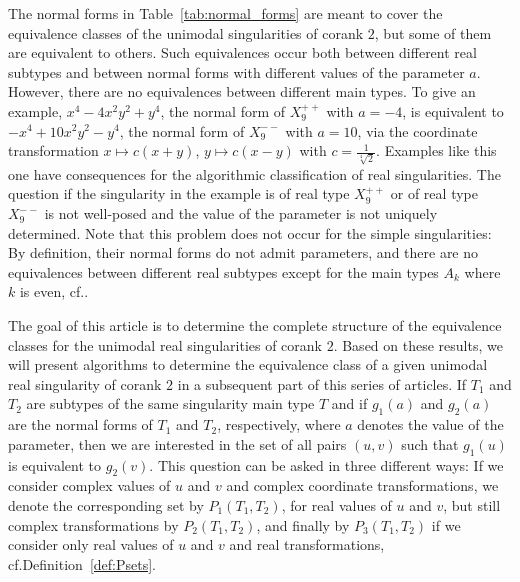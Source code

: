 \documentclass[noend]{amsproc}
\theoremstyle{definition}
\begin{document}
The normal forms in Table~\ref{tab:normal_forms} are meant to cover the
equivalence classes of the unimodal singularities of corank $2$, but some of
them are equivalent to others. Such equivalences occur both between different
real subtypes and between normal forms with different values of the parameter
$a$. However, there are no equivalences between different main types. To give
an example, $x^4-4x^2y^2+y^4$, the normal form of $X_9^{++}$ with $a = -4$, is
equivalent to $-x^4+10x^2y^2-y^4$, the normal form of $X_9^{--}$ with $a = 10$,
via the coordinate transformation $x \mapsto c(x+y)$, $y \mapsto c(x-y)$ with
$c = \frac{1}{\sqrt[4]{2}}$. Examples like this one have consequences for the
algorithmic classification of real singularities. The question if the
singularity in the example is of real type $X_9^{++}$ or of real type
$X_9^{--}$ is not well-posed and the value of the parameter is not uniquely
determined. Note that this problem does not occur for the simple singularities:
By definition, their normal forms do not admit parameters, and there are no
equivalences between different real subtypes except for the main types $A_k$
where $k$ is even, cf.\@ \citet{MS2013}.

The goal of this article is to determine the complete structure of the
equivalence classes for the unimodal real singularities of corank $2$. Based on
these results, we will present algorithms to determine the equivalence class of
a given unimodal real singularity of corank $2$ in a subsequent part of this
series of articles. If $T_1$ and $T_2$ are subtypes of the same singularity
main type $T$ and if $g_1(a)$ and $g_2(a)$ are the normal forms of $T_1$ and
$T_2$, respectively, where $a$ denotes the value of the parameter, then we are
interested in the set of all pairs $(u, v)$ such that $g_1(u)$ is equivalent to
$g_2(v)$. This question can be asked in three different ways: If we consider
complex values of $u$ and $v$ and complex coordinate transformations, we denote
the corresponding set by $P_1(T_1, T_2)$, for real values of $u$ and $v$, but
still complex transformations by $P_2(T_1, T_2)$, and finally by
$P_3(T_1, T_2)$ if we consider only real values of $u$ and $v$ and real
transformations, cf.\@ Definition~\ref{def:Psets}.
\end{document}

